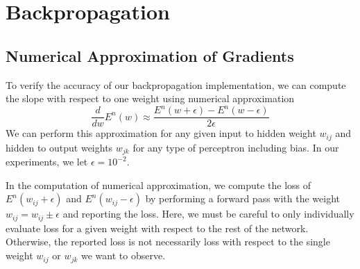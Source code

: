 \section{Backpropagation}

\subsection{Numerical Approximation of Gradients}
To verify the accuracy of our backpropagation implementation, we can compute the
slope with respect to one weight using numerical approximation
\begin{equation*}
	\frac{d}{d w} E^n(w) \approx \frac{E^n(w+\epsilon)-E^n(w-\epsilon)}{2 \epsilon}
\end{equation*}
We can perform this approximation for any given input to hidden weight $w_{ij}$
and hidden to output weights $w_{jk}$ for any type of perceptron including bias.
In our experiments, we let $\epsilon = 10^{-2}$.

In the computation of numerical approximation, we compute the loss of $E^n\left(
	w_{ij} + \epsilon \right) $ and $E^n\left( w_{ij} - \epsilon \right) $ by
performing a forward pass with the weight $w_{ij} = w_{ij} \pm \epsilon$ and
reporting the loss. Here, we must be careful to only individually evaluate
loss for a given weight with respect to the rest of the network. Otherwise,
the reported loss is not necessarily loss with respect to the single weight
$w_{ij}$ or $w_{jk}$ we want to observe.

